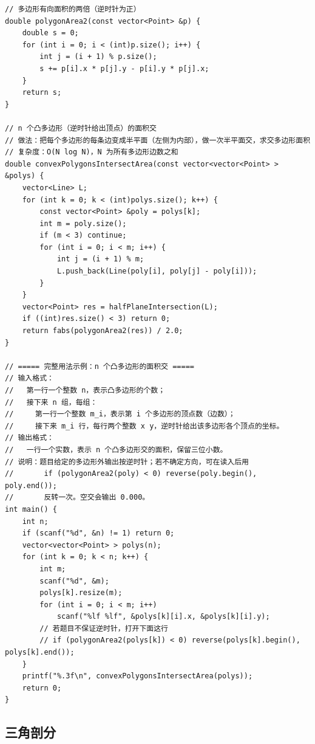 \documentclass[11pt,a4paper]{ctexart}
\begin{document}
\begin{lstlisting}
// 多边形有向面积的两倍（逆时针为正）
double polygonArea2(const vector<Point> &p) {
    double s = 0;
    for (int i = 0; i < (int)p.size(); i++) {
        int j = (i + 1) % p.size();
        s += p[i].x * p[j].y - p[i].y * p[j].x;
    }
    return s;
}

// n 个凸多边形（逆时针给出顶点）的面积交
// 做法：把每个多边形的每条边变成半平面（左侧为内部），做一次半平面交，求交多边形面积
// 复杂度：O(N log N)，N 为所有多边形边数之和
double convexPolygonsIntersectArea(const vector<vector<Point> > &polys) {
    vector<Line> L;
    for (int k = 0; k < (int)polys.size(); k++) {
        const vector<Point> &poly = polys[k];
        int m = poly.size();
        if (m < 3) continue;
        for (int i = 0; i < m; i++) {
            int j = (i + 1) % m;
            L.push_back(Line(poly[i], poly[j] - poly[i]));
        }
    }
    vector<Point> res = halfPlaneIntersection(L);
    if ((int)res.size() < 3) return 0;
    return fabs(polygonArea2(res)) / 2.0;
}

// ===== 完整用法示例：n 个凸多边形的面积交 =====
// 输入格式：
//   第一行一个整数 n，表示凸多边形的个数；
//   接下来 n 组，每组：
//     第一行一个整数 m_i，表示第 i 个多边形的顶点数（边数）；
//     接下来 m_i 行，每行两个整数 x y，逆时针给出该多边形各个顶点的坐标。
// 输出格式：
//   一行一个实数，表示 n 个凸多边形交的面积，保留三位小数。
// 说明：题目给定的多边形外输出按逆时针；若不确定方向，可在读入后用
//       if (polygonArea2(poly) < 0) reverse(poly.begin(), poly.end());
//       反转一次。空交会输出 0.000。
int main() {
    int n;
    if (scanf("%d", &n) != 1) return 0;
    vector<vector<Point> > polys(n);
    for (int k = 0; k < n; k++) {
        int m;
        scanf("%d", &m);
        polys[k].resize(m);
        for (int i = 0; i < m; i++)
            scanf("%lf %lf", &polys[k][i].x, &polys[k][i].y);
        // 若题目不保证逆时针，打开下面这行
        // if (polygonArea2(polys[k]) < 0) reverse(polys[k].begin(), polys[k].end());
    }
    printf("%.3f\n", convexPolygonsIntersectArea(polys));
    return 0;
}
\end{lstlisting}

\subsection{三角剖分}
\end{document}
